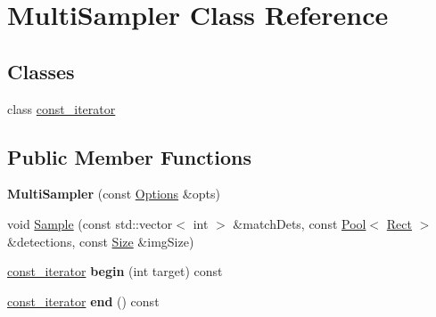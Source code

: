 \hypertarget{classMultiSampler}{}\section{Multi\+Sampler Class Reference}
\label{classMultiSampler}
\subsection*{Classes}
\begin{DoxyCompactItemize}
\item 
class \hyperlink{classMultiSampler_1_1const__iterator}{const\+\_\+iterator}
\end{DoxyCompactItemize}
\subsection*{Public Member Functions}
\begin{DoxyCompactItemize}
\item 
\hypertarget{classMultiSampler_aca627fa4a72f7e7160dc5c8b519124d1}{}{\bfseries Multi\+Sampler} (const \hyperlink{structOptions}{Options} \&opts)\label{classMultiSampler_aca627fa4a72f7e7160dc5c8b519124d1}

\item 
void \hyperlink{classMultiSampler_af1ef1ab752aff145c7205c137f157691}{Sample} (const std\+::vector$<$ int $>$ \&match\+Dets, const \hyperlink{classPool}{Pool}$<$ \hyperlink{classRect}{Rect} $>$ \&detections, const \hyperlink{classSize}{Size} \&img\+Size)
\item 
\hypertarget{classMultiSampler_a2eaa867c6f0a660c8b172252ce289f84}{}\hyperlink{classMultiSampler_1_1const__iterator}{const\+\_\+iterator} {\bfseries begin} (int target) const \label{classMultiSampler_a2eaa867c6f0a660c8b172252ce289f84}

\item 
\hypertarget{classMultiSampler_a2db4ffc56e50cebe82b1df13e7b43bcf}{}\hyperlink{classMultiSampler_1_1const__iterator}{const\+\_\+iterator} {\bfseries end} () const \label{classMultiSampler_a2db4ffc56e50cebe82b1df13e7b43bcf}

\end{DoxyCompactItemize}

